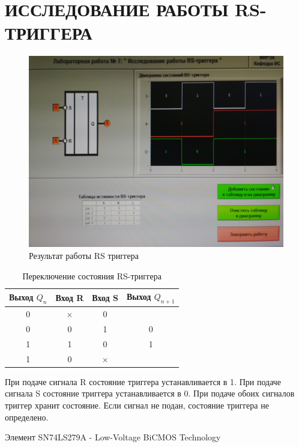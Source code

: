 \section{ИССЛЕДОВАНИЕ РАБОТЫ RS-ТРИГГЕРА}

\begin{figure}[H]
	\centering
	\includegraphics[width=0.95\linewidth]{imgs/7/1}
	\caption{Результат работы RS триггера}
	\label{fig:7_}
\end{figure}

\begin{table}[H]
	\centering
	\caption{Переключение состояния RS-триггера}
	\label{tab:lab_07}
	\begin{tabular}{|c|c|c|c|}
		\hline
		Выход $Q_n$ & Вход R   & Вход S   & Выход $Q_{n+1}$ \\ \hline
		0           & $\times$ & 0        &                 \\ \hline
		0           & 0        & 1        & 0               \\ \hline
		1           & 1        & 0        & 1               \\ \hline
		1           & 0        & $\times$ &                 \\ \hline
	\end{tabular}
\end{table}

При подаче сигнала R состояние триггера устанавливается в 1.
При подаче сигнала S состояние триггера устанавливается в 0.
При подаче обоих сигналов триггер хранит состояние.
Если сигнал не подан, состояние триггера не определено.

Элемент SN74LS279A - Low-Voltage BiCMOS Technology

